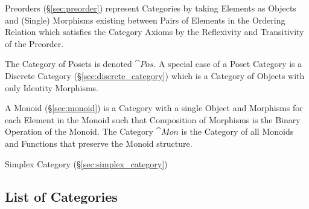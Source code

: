 Preorders (\S\ref{sec:preorder}) represent Categories by taking
Elements as Objects and (Single) Morphisms existing between Pairs of
Elements in the Ordering Relation which satisfies the Category Axioms
by the Reflexivity and Transitivity of the Preorder.

The Category of Posets is denoted $\cat{Pos}$. A special case of a
Poset Category is a Discrete Category (\S\ref{sec:discrete_category})
which is a Category of Objects with only Identity Morphisms.

A Monoid (\S\ref{sec:monoid}) is a Category with a single Object and
Morphisms for each Element in the Monoid such that Composition of
Morphisms is the Binary Operation of the Monoid. The Category
$\cat{Mon}$ is the Category of all Monoids and Functions that
preserve the Monoid structure.

Simplex Category (\S\ref{sec:simplex_category})



\subsection{List of Categories}\label{sec:categories_list}


